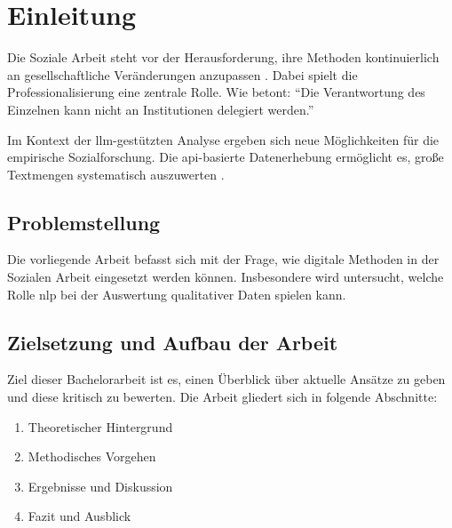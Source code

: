 \chapter{Einleitung}
\label{ch:einleitung}

Die Soziale Arbeit steht vor der Herausforderung, ihre Methoden kontinuierlich an gesellschaftliche Veränderungen anzupassen \parencite[vgl.][12\psq]{mueller2020}. Dabei spielt die Professionalisierung eine zentrale Rolle. Wie \textcite[42]{bonhoeffer1994} betont: \enquote{Die Verantwortung des Einzelnen kann nicht an Institutionen delegiert werden.}

Im Kontext der \gls{llm}-gestützten Analyse ergeben sich neue Möglichkeiten für die empirische Sozialforschung. Die \gls{api}-basierte Datenerhebung ermöglicht es, große Textmengen systematisch auszuwerten \parencite[vgl.][]{schmidt2019}.

\section{Problemstellung}

Die vorliegende Arbeit befasst sich mit der Frage, wie digitale Methoden in der Sozialen Arbeit eingesetzt werden können. Insbesondere wird untersucht, welche Rolle \gls{nlp} bei der Auswertung qualitativer Daten spielen kann.

\section{Zielsetzung und Aufbau der Arbeit}

Ziel dieser Bachelorarbeit ist es, einen Überblick über aktuelle Ansätze zu geben und diese kritisch zu bewerten. Die Arbeit gliedert sich in folgende Abschnitte:

\begin{enumerate}
    \item Theoretischer Hintergrund
    \item Methodisches Vorgehen
    \item Ergebnisse und Diskussion
    \item Fazit und Ausblick
\end{enumerate}

\nocite{*}
